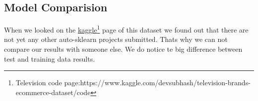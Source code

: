 \subsection{Model Comparision}
\newcommand{\kagglelinktvcode}{https://www.kaggle.com/devsubhash/television-brands-ecommerce-dataset/code}

When we looked on the \href{\kagglelinktvcode}{kaggle\footnote{Television code page:\href{\kagglelinktvcode}{\kagglelinktvcode}}} page of this dataset we found out that there are not yet any other auto-sklearn projects submitted. Thats why we can not compare our results with someone else. We do notice te big difference between test and training data results.
